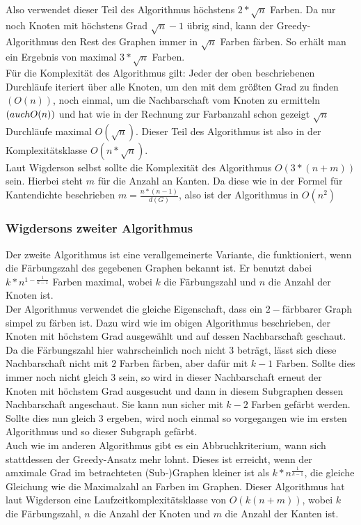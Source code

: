\documentclass[11pt]{article}
\begin{document}
Also verwendet dieser Teil des Algorithmus höchstens $2*\sqrt{n}$ Farben. Da nur noch Knoten mit höchstens Grad $\sqrt{n}-1$ übrig sind, kann der Greedy-Algorithmus
den Rest des Graphen immer in $\sqrt{n}$ Farben färben. So erhält man ein Ergebnis von maximal $3*\sqrt{n}$ Farben. \\
Für die Komplexität des Algorithmus gilt: Jeder der oben beschriebenen Durchläufe iteriert über alle Knoten, um den mit dem größten Grad zu finden $(O(n))$,
noch einmal, um die Nachbarschaft vom Knoten zu ermitteln $(auch \space O(n))$ %
und hat wie in der Rechnung zur Farbanzahl schon gezeigt $\sqrt{n}$ Durchläufe maximal $O(\sqrt{n})$.
Dieser Teil des Algorithmus ist also in der Komplexitätsklasse $O(n*\sqrt{n})$. \\
Laut Wigderson selbst sollte die Komplexität des Algorithmus $O(3*(n+m))$ sein. Hierbei steht $m$ für die Anzahl an Kanten. Da diese wie in der Formel für Kantendichte beschrieben $m = \frac{n*(n-1)}{d(G)}$, also ist der Algorithmus in $O(n^2)$ \\

\subsubsection{Wigdersons zweiter Algorithmus}

Der zweite Algorithmus ist eine verallgemeinerte Variante, die funktioniert, wenn die Färbungszahl des gegebenen Graphen bekannt ist.
Er benutzt dabei $k*n^{1-\frac{1}{k-1}}$ Farben maximal, wobei $k$ die Färbungszahl und $n$ die Anzahl der Knoten ist. \\
Der Algorithmus verwendet die gleiche Eigenschaft, dass ein $2-$färbbarer Graph simpel zu färben ist.
Dazu wird wie im obigen Algorithmus beschrieben, der Knoten mit höchstem Grad ausgewählt und auf dessen Nachbarschaft geschaut. Da die Färbungszahl hier wahrscheinlich noch nicht $3$ beträgt, lässt sich diese Nachbarschaft nicht mit $2$ Farben färben, aber dafür mit $k-1$ Farben. Sollte dies immer noch nicht gleich $3$ sein, so wird in dieser Nachbarschaft erneut der Knoten mit höchstem Grad ausgesucht und dann in diesem Subgraphen dessen Nachbarschaft angeschaut. Sie kann nun sicher mit $k-2$ Farben gefärbt werden. Sollte dies nun gleich $3$ ergeben, wird noch einmal so vorgegangen wie im ersten Algorithmus und so dieser Subgraph gefärbt. \\
Auch wie im anderen Algorithmus gibt es ein Abbruchkriterium, wann sich stattdessen der Greedy-Ansatz mehr lohnt. Dieses ist erreicht, wenn der amximale Grad im betrachteten (Sub-)Graphen kleiner ist als $k*n^{\frac{1}{k-1}}$, die gleiche Gleichung wie die Maximalzahl an Farben im Graphen.
Dieser Algorithmus hat laut Wigderson eine Laufzeitkomplexitätsklasse von $O(k(n+m))$, wobei $k$ die Färbungszahl, $n$ die Anzahl der Knoten und $m$ die Anzahl der Kanten ist.
\end{document}
